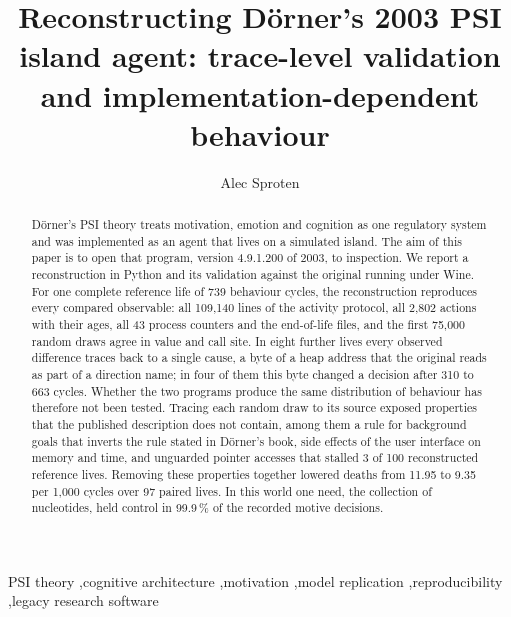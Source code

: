 \documentclass[preprint,12pt,authoryear]{elsarticle}
\begin{document}
\begin{frontmatter}

\title{Reconstructing D\"orner's 2003 PSI island agent: trace-level validation and implementation-dependent behaviour}

\author{Alec Sproten}

\begin{abstract}
D\"orner's PSI theory treats motivation, emotion and cognition as one regulatory system and was implemented as an agent that lives on a simulated island. The aim of this paper is to open that program, version 4.9.1.200 of 2003, to inspection. We report a reconstruction in Python and its validation against the original running under Wine. For one complete reference life of 739 behaviour cycles, the reconstruction reproduces every compared observable: all 109{,}140 lines of the activity protocol, all 2{,}802 actions with their ages, all 43 process counters and the end-of-life files, and the first 75{,}000 random draws agree in value and call site. In eight further lives every observed difference traces back to a single cause, a byte of a heap address that the original reads as part of a direction name; in four of them this byte changed a decision after 310 to 663 cycles. Whether the two programs produce the same distribution of behaviour has therefore not been tested. Tracing each random draw to its source exposed properties that the published description does not contain, among them a rule for background goals that inverts the rule stated in D\"orner's book, side effects of the user interface on memory and time, and unguarded pointer accesses that stalled 3 of 100 reconstructed reference lives. Removing these properties together lowered deaths from 11.95 to 9.35 per 1{,}000 cycles over 97 paired lives. In this world one need, the collection of nucleotides, held control in 99.9\,\% of the recorded motive decisions.
\end{abstract}

\begin{keyword}
PSI theory \sep cognitive architecture \sep motivation \sep model replication \sep reproducibility \sep legacy research software
\end{keyword}

\end{frontmatter}
\end{document}
